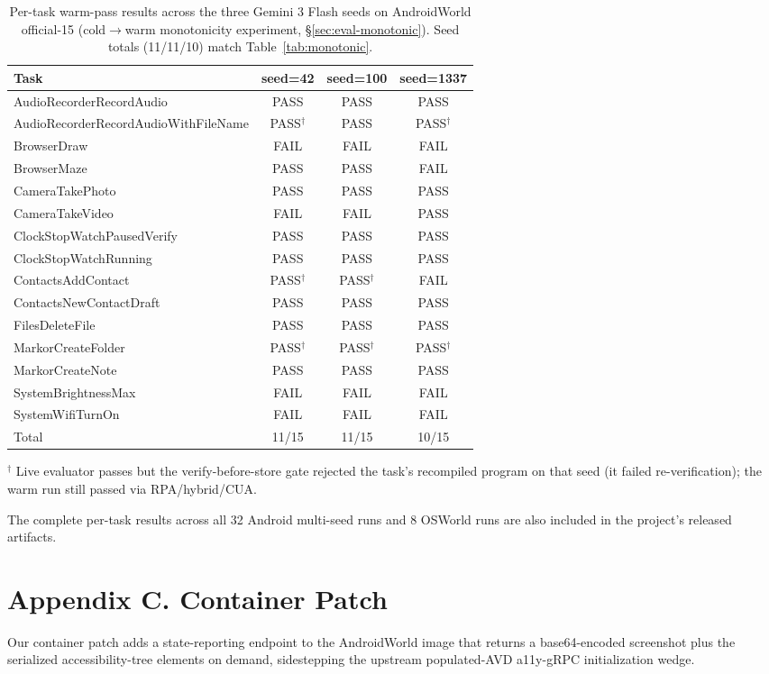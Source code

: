 \documentclass[11pt]{article}
\begin{document}
\begin{table}[h]
\centering
\caption{Per-task warm-pass results across the three Gemini 3 Flash seeds on AndroidWorld official-15 (cold$\to$warm monotonicity experiment, \S\ref{sec:eval-monotonic}). Seed totals (11/11/10) match Table~\ref{tab:monotonic}.}
\label{tab:gemini-3seed}
\small
\begin{tabular}{@{}lccc@{}}
\toprule
Task & seed=42 & seed=100 & seed=1337 \\
\midrule
AudioRecorderRecordAudio & PASS & PASS & PASS \\
AudioRecorderRecordAudioWithFileName & PASS$^\dagger$ & PASS & PASS$^\dagger$ \\
BrowserDraw & FAIL & FAIL & FAIL \\
BrowserMaze & PASS & PASS & FAIL \\
CameraTakePhoto & PASS & PASS & PASS \\
CameraTakeVideo & FAIL & FAIL & PASS \\
ClockStopWatchPausedVerify & PASS & PASS & PASS \\
ClockStopWatchRunning & PASS & PASS & PASS \\
ContactsAddContact & PASS$^\dagger$ & PASS$^\dagger$ & FAIL \\
ContactsNewContactDraft & PASS & PASS & PASS \\
FilesDeleteFile & PASS & PASS & PASS \\
MarkorCreateFolder & PASS$^\dagger$ & PASS$^\dagger$ & PASS$^\dagger$ \\
MarkorCreateNote & PASS & PASS & PASS \\
SystemBrightnessMax & FAIL & FAIL & FAIL \\
SystemWifiTurnOn & FAIL & FAIL & FAIL \\
\midrule
Total & 11/15 & 11/15 & 10/15 \\
\bottomrule
\end{tabular}

\vspace{0.5em}
\footnotesize $^\dagger$ Live evaluator passes but the verify-before-store gate rejected the task's recompiled program on that seed (it failed re-verification); the warm run still passed via RPA/hybrid/CUA.
\end{table}

The complete per-task results across all 32 Android multi-seed runs and 8 OSWorld runs are also included in the project's released artifacts.

\section*{Appendix C. Container Patch}
Our container patch adds a state-reporting endpoint to the AndroidWorld image that returns a base64-encoded screenshot plus the serialized accessibility-tree elements on demand, sidestepping the upstream populated-AVD a11y-gRPC initialization wedge.
\end{document}
